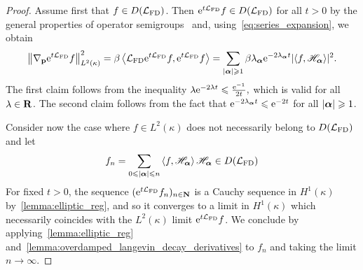 \documentclass[11pt,a4paper]{article}
\begin{document}
\begin{proof}
    Assume first that $f \in D(\mathcal L_{\rm FD})$.
    Then $\mathrm{e}^{t \mathcal L_{\rm FD} } f \in D(\mathcal L_{\rm FD})$ for all $t > 0$ by the general properties of operator semigroups~\cite{MR710486} and,
    using~\eqref{eq:series_expansion}, we obtain
    \begin{equation}
        \label{eq:gradient_series}
        \norm{\grad_{\vect p} \e^{t \mathcal L_{\rm FD}} f}_{L^2(\kappa)}^2 = \beta \ip{\mathcal L_{\rm FD} \e^{t \mathcal L_{\rm FD}} f}{\e^{t \mathcal L_{\rm FD}} f}
        = \sum_{\abs{\vect \alpha} \geq 1} \beta \lambda_{\vect \alpha} \e^{- 2\lambda_{\vect \alpha} t} \lvert \ip{f}{\mathscr H_{\vect \alpha}} \rvert^2.
    \end{equation}
    The first claim follows from the inequality
    \(
        \lambda \mathrm{e}^{- 2\lambda t} \leqslant \frac{\mathrm{e}^{-1}}{2 t},
    \)
    which is valid for all $\lambda \in \mathbf R$.
    The second claim follows from the fact that $\mathrm{e}^{-2\lambda_{\boldsymbol{\mathbf \alpha}} t} \leqslant \mathrm{e}^{-2t}$ for all $|\boldsymbol{\mathbf \alpha}| \geqslant 1$.


    Consider now the case where $f \in L^2(\kappa)$ does not necessarily belong to $D(\mathcal L_{\rm FD})$
    and let
    \[
        f_n = \sum_{0 \leq \abs{\vect \alpha} \leq n} \ip{f}{\mathscr H_{\vect \alpha}} \mathscr H_{\vect \alpha} \in D(\mathcal L_{\rm FD})
    \]
    For fixed $t > 0$, the sequence $(\mathrm{e}^{t \mathcal L_{\rm FD}}f_n)_{n\in \mathbf N}$ is a Cauchy sequence in $H^1(\kappa)$ by~\eqref{lemma:elliptic_reg},
    and so it converges to a limit in $H^1(\kappa)$ which necessarily coincides with the $L^2(\kappa)$ limit $\mathrm{e}^{t \mathcal L_{\rm FD}} f$.
    We conclude by applying~\eqref{lemma:elliptic_reg} and~\eqref{lemma:overdamped_langevin_decay_derivatives} to $f_n$ and taking the limit $n \to \infty$.
\end{proof}

\end{document}
